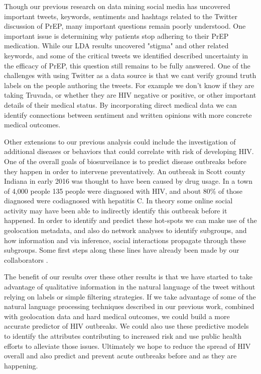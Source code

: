 Though our previous research on data mining social media has uncovered important tweets, keywords, sentiments and hashtags related to the Twitter discussion of PrEP, many important questions remain poorly understood. One important issue is determining why patients stop adhering to their PrEP medication. While our LDA results uncovered "stigma" and other related keywords, and some of the critical tweets we identified described uncertainty in the efficacy of PrEP, this question still remains to be fully answered. One of the challenges with using Twitter as a data source is that we cant verify ground truth labels on the people authoring the tweets. For example we don't know if they are taking Truvada, or whether they are HIV negative or positive, or other important details of their medical status. By incorporating direct medical data we can identify connections between sentiment and written opinions with more concrete medical outcomes.

Other extensions to our previous analysis could include the investigation of additional diseases or behaviors that could correlate with risk of developing HIV. One of the overall goals of biosurveilance is to predict disease outbreaks before they happen in order to intervene preventatively. An outbreak in Scott county Indiana in early 2016 was thought to have been caused by drug usage. In a town of 4,000 people 135 people were diagnosed with HIV, and about 80\% of those diagnosed were codiagnosed with hepatitis C. In theory some online social activity may have been able to indirectly identify this outbreak before it happened\cite{conrad2015community}. In order to identify and predict these hot-spots we can make use of the geolocation metadata, and also do network analyses to identify subgroups, and how information and via inference, social interactions propagate through these subgroups. Some first steps along these lines have already been made by our collaborators \cite{young2014methods}.

The benefit of our results over these other results is that we have started to take advantage of qualitative information in the natural language of the tweet without relying on labels or simple filtering strategies. If we take advantage of some of the natural language processing techniques described in our previous work, combined with geolocation data and hard medical outcomes, we could build a more accurate predictor of HIV outbreaks. We could also use these predictive models to identify the attributes contributing to increased risk and use public health efforts to alleviate those issues. Ultimately we hope to reduce the spread of HIV overall and also predict and prevent acute outbreaks before and as they are happening.

